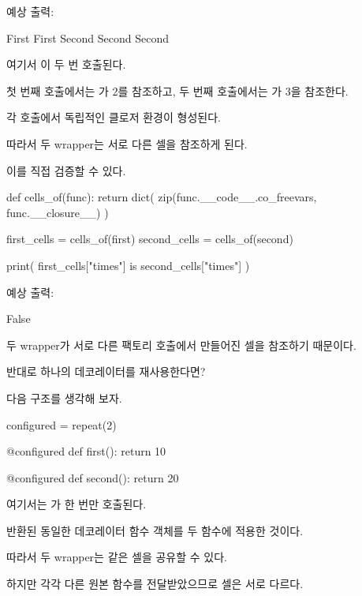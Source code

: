 예상 출력:

\begin{dhkzsh}
First
First
Second
Second
Second
\end{dhkzsh}

여기서 이 두 번 호출된다.

첫 번째 호출에서는 가 2를 참조하고, 두 번째 호출에서는 가 3을 참조한다.

각 호출에서 독립적인 클로저 환경이 형성된다.

따라서 두 wrapper는 서로 다른  셀을 참조하게 된다.

이를 직접 검증할 수 있다.

\begin{dhkcode}
def cells_of(func):
    return dict(
        zip(func.__code__.co_freevars, func.__closure__)
    )


first_cells = cells_of(first)
second_cells = cells_of(second)

print(
    first_cells["times"] is second_cells["times"]
)
\end{dhkcode}

예상 출력:

\begin{dhkzsh}
False
\end{dhkzsh}

두 wrapper가 서로 다른 팩토리 호출에서 만들어진 셀을 참조하기 때문이다.

\begin{dhknote}
\begin{dhksmry}[centered]
반대로 하나의 데코레이터를 재사용한다면?
\end{dhksmry}
\end{dhknote}

다음 구조를 생각해 보자.

\begin{dhkcode}
configured = repeat(2)

@configured
def first():
    return 10


@configured
def second():
    return 20
\end{dhkcode}

여기서는 가 한 번만 호출된다.

반환된 동일한  데코레이터 함수 객체를 두 함수에 적용한 것이다.

따라서 두 wrapper는 같은  셀을 공유할 수 있다.

하지만 각각 다른 원본 함수를 전달받았으므로  셀은 서로 다르다.

